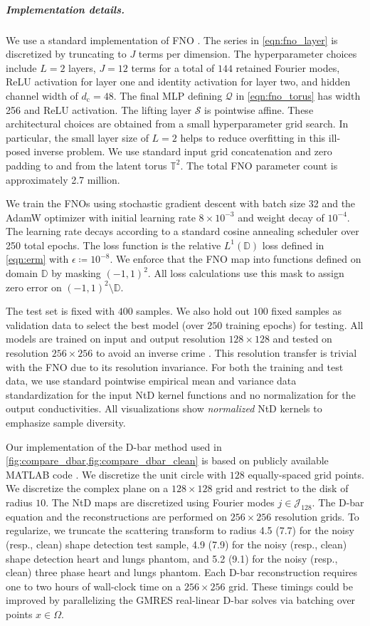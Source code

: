 \documentclass[pdflatex,sn-mathphys-num]{sn-jnl-preprint}
\newcommand{\T}{\mathbb{T}}
\newcommand{\D}{\mathbb{D}}
\newcommand{\cS}{\mathcal{S}}
\newcommand{\cQ}{\mathcal{Q}}
\newcommand{\defeq}{\coloneqq} %
\theoremstyle{thmstyleone}%
\theoremstyle{thmstyletwo}%
\theoremstyle{thmstylethree}%
\numberwithin{equation}{section}
\numberwithin{theorem}{section}
\begin{document}
\begin{appendices}
\subparagraph*{\emph{\textbf{Implementation details.}}}
We use a standard implementation of FNO \cite{li2020fourier,huang2025operator}. The series in \eqref{eqn:fno_layer} is discretized by truncating to $J$ terms per dimension. The hyperparameter choices include $L=2$ layers, $J=12$ terms for a total of $144$ retained Fourier modes, ReLU activation for layer one and identity activation for layer two, and hidden channel width of $d_\mathrm{c}=48$. The final MLP defining $\cQ$ in \eqref{eqn:fno_torus} has width 256 and ReLU activation. The lifting layer $\cS$ is pointwise affine. These architectural choices are obtained from a small hyperparameter grid search. In particular, the small layer size of $L=2$ helps to reduce overfitting in this ill-posed inverse problem. We use standard input grid concatenation and zero padding to and from the latent torus $\T^2$. The total FNO parameter count is approximately 2.7 million.

We train the FNOs using stochastic gradient descent with batch size 32 and the AdamW optimizer with initial learning rate $8\times 10^{-3}$ and weight decay of $10^{-4}$. The learning rate decays according to a standard cosine annealing scheduler over 250 total epochs. The loss function is the relative $L^1(\D)$ loss defined in \eqref{eqn:erm} with $\epsilon\defeq 10^{-8}$. We enforce that the FNO map into functions defined on domain $\D$ by masking $(-1,1)^2$. All loss calculations use this mask to assign zero error on $(-1,1)^2\setminus\D$.

The test set is fixed with $400$ samples. We also hold out $100$ fixed samples as validation data to select the best model (over $250$ training epochs) for testing. All models are trained on input and output resolution $128\times 128$ and tested on resolution $256\times 256$ to avoid an inverse crime \cite{kaipio2005statistical}. This resolution transfer is trivial with the FNO due to its resolution invariance. For both the training and test data, we use standard pointwise empirical mean and variance data standardization for the input NtD kernel functions and no normalization for the output conductivities. All visualizations show \emph{normalized} NtD kernels to emphasize sample diversity.

Our implementation of the D-bar method used in \cref{fig:compare_dbar,fig:compare_dbar_clean} is based on publicly available MATLAB code \cite[Chp.~15]{mueller2012linear}. We discretize the unit circle with $128$ equally-spaced grid points. We discretize the complex plane on a $128\times 128$ grid and restrict to the disk of radius $10$. The NtD maps are discretized using Fourier modes $j\in\mathcal{J}_{128}$. The D-bar equation and the reconstructions are performed on $256\times 256$ resolution grids. To regularize, we truncate the scattering transform to radius 4.5 (7.7) for the noisy (resp., clean) shape detection test sample, 4.9 (7.9) for the noisy (resp., clean) shape detection heart and lungs phantom, and 5.2 (9.1) for the noisy (resp., clean) three phase heart and lungs phantom.
Each D-bar reconstruction requires one to two hours of wall-clock time on a $256\times 256$ grid. These timings could be improved by parallelizing the GMRES real-linear D-bar solves via batching over points $x\in\Omega$.


\end{appendices}
\end{document}
